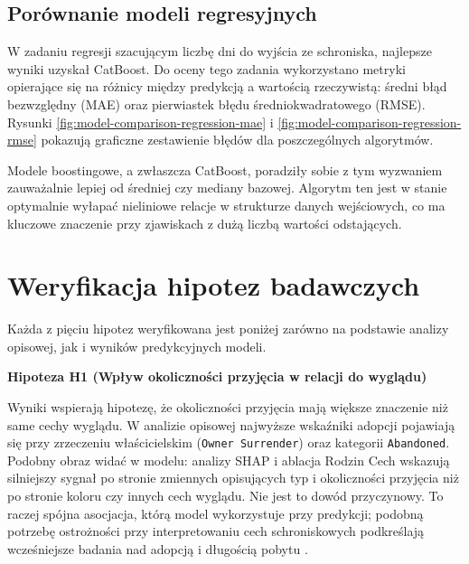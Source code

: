 \subsection{Porównanie modeli regresyjnych}

W zadaniu regresji szacującym liczbę dni do wyjścia ze schroniska, najlepsze wyniki uzyskał CatBoost. Do oceny tego zadania wykorzystano metryki opierające się na różnicy między predykcją a wartością rzeczywistą: średni błąd bezwzględny (MAE) oraz pierwiastek błędu średniokwadratowego (RMSE). Rysunki \ref{fig:model-comparison-regression-mae} i \ref{fig:model-comparison-regression-rmse} pokazują graficzne zestawienie błędów dla poszczególnych algorytmów. 



Modele boostingowe, a zwłaszcza CatBoost, poradziły sobie z tym wyzwaniem zauważalnie lepiej od średniej czy mediany bazowej. Algorytm ten jest w stanie optymalnie wyłapać nieliniowe relacje w strukturze danych wejściowych, co ma kluczowe znaczenie przy zjawiskach z dużą liczbą wartości odstających.

\section{Weryfikacja hipotez badawczych}
\label{sec:weryfikacja-hipotez-badawczych}

Każda z pięciu hipotez weryfikowana jest poniżej zarówno na podstawie analizy opisowej, jak i wyników predykcyjnych modeli.

\textbf{Hipoteza H1 (Wpływ okoliczności przyjęcia w relacji do wyglądu)}

Wyniki wspierają hipotezę, że okoliczności przyjęcia mają większe znaczenie niż same cechy wyglądu. W analizie opisowej najwyższe wskaźniki adopcji pojawiają się przy zrzeczeniu właścicielskim (\texttt{Owner Surrender}) oraz kategorii \texttt{Abandoned}. Podobny obraz widać w modelu: analizy SHAP i ablacja Rodzin Cech wskazują silniejszy sygnał po stronie zmiennych opisujących typ i okoliczności przyjęcia niż po stronie koloru czy innych cech wyglądu. Nie jest to dowód przyczynowy. To raczej spójna asocjacja, którą model wykorzystuje przy predykcji; podobną potrzebę ostrożności przy interpretowaniu cech schroniskowych podkreślają wcześniejsze badania nad adopcją i długością pobytu \cite{Bradley2021,Cain2020}.

